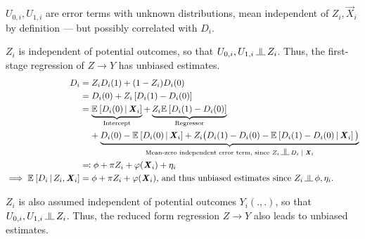 $U_{0,i}, U_{1,i}$ are error terms with unknown distributions, mean independent of $Z_i, \vec X_i$ by definition --- but possibly correlated with $D_i$.

$Z_i$ is independent of potential outcomes, so that $U_{0,i}, U_{1,i} \indep Z_i$.
Thus, the first-stage regression of $Z \to Y$ has unbiased estimates.
\begin{align*}
    D_i &= Z_i D_i(1) + (1 - Z_i) D_i(0) \\
        &= D_i(0) +
            Z_i \left[ D_i(1) - D_i(0) \right] \\
        &= \underbrace{\Egiven{D_i(0)}{\vec X_i}        
        }_{\text{Intercept}} +
            \underbrace{Z_i \E{ D_i(1) - D_i(0)}}_{
                \text{Regressor}} \\
            & \;\;\;\; + \underbrace{
                D_i(0) - \Egiven{D_i(0)}{\vec X_i}
                + Z_i \big( D_i(1) - D_i(0) - \Egiven{ D_i(1) - D_i(0)}{\vec X_i}\big)}_{
                \text{Mean-zero independent error term, since }Z_i \indep D_i \; | \; \vec X_i} \\
        &\eqqcolon \phi + \pi Z_i + \varphi(\vec X_i) + \eta_i \\
    \implies \Egiven{D_i}{Z_i, \vec X_i}&=
        \phi + \pi Z_i + \varphi(\vec X_i)
        \text{, and thus unbiased estimates since } Z_i \indep \phi, \eta_i.
\end{align*}

$Z_i$ is also assumed independent of potential outcomes $Y_i(.,.)$, so that $U_{0,i}, U_{1,i} \indep Z_i$.
Thus, the reduced form regression $Z \to Y$ also leads to unbiased estimates.

